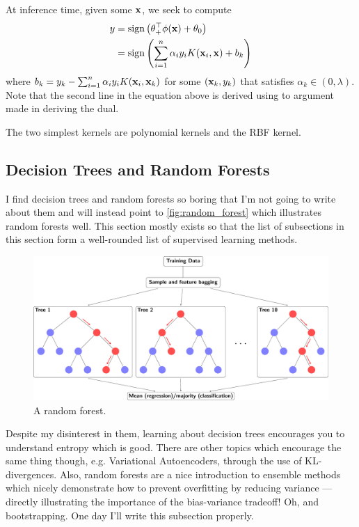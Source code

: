 \documentclass[11pt]{article}
\begin{document}
At inference time, given some $\mathbf{x}$, we seek to compute
\begin{align*}
    y
    &=
    \text{sign}\left(\theta_+^\top\phi(\mathbf{x})+\theta_0\right)\\
    &=
    \text{sign}\left(\sum_{i=1}^n\alpha_iy_iK(\mathbf{x}_i,\mathbf{x})+b_k\right)
\end{align*}
where $b_k=y_k-\sum_{i=1}^n\alpha_iy_iK(\mathbf{x}_i,\mathbf{x}_k)$ for some $(\mathbf{x}_k,y_k)$ that satisfies $\alpha_k\in(0,\lambda)$. Note that the second line in the equation above is derived using to argument made in deriving the dual.

The two simplest kernels are polynomial kernels and the RBF kernel. 

\subsection{Decision Trees and Random Forests}
I find decision trees and random forests so boring that I'm not going to write about them and will instead point to \autoref{fig:random_forest} which illustrates random forests well. This section mostly exists so that the list of subsections in this section form a well-rounded list of supervised learning methods.

\begin{figure}[t]
    \centering
    \includegraphics[width=\columnwidth]{./figures/supervised_learning/random_forest.pdf}
    \caption{A random forest.}
    \label{fig:random_forest}
\end{figure}

Despite my disinterest in them, learning about decision trees encourages you to understand entropy which is good. There are other topics which encourage the same thing though, e.g. Variational Autoencoders, through the use of KL-divergences. Also, random forests are a nice introduction to ensemble methods which nicely demonstrate how to prevent overfitting by reducing variance — directly illustrating the importance of the bias-variance tradeoff! Oh, and bootstrapping. One day I'll write this subsection properly.
\end{document}
